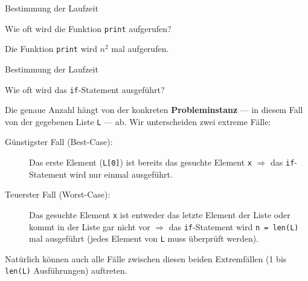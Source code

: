 \begin{frame}{Bestimmung der Laufzeit \faStar\faStar[regular]\faStar[regular]\faStar[regular]\faStar[regular]}
	\begin{myexercise}
	

	Wie oft wird die Funktion \lstinline{print} aufgerufen?
	\end{myexercise}
\end{frame}

\begin{frame}
\begin{myanswer}
	Die Funktion \lstinline{print} wird $n^2$ mal aufgerufen.
\end{myanswer}
\end{frame}

\begin{frame}{Bestimmung der Laufzeit \faStar\faStar\faStar[regular]\faStar[regular]\faStar[regular]}
	\begin{myexercise}
	

	Wie oft wird das \lstinline{if}-Statement ausgeführt? 
	\end{myexercise}
\end{frame}

\begin{frame}
\begin{myanswer}
	Die genaue Anzahl hängt von der konkreten \textbf{Probleminstanz} --- in diesem Fall von der gegebenen Liste \lstinline{L} --- ab. Wir unterscheiden zwei extreme Fälle:
	\begin{description}
		\item[Günstigster Fall (Best-Case):] Das erste Element (\lstinline{L[0]}) ist bereits das gesuchte Element \lstinline{x} $\Rightarrow$ das \lstinline{if}-Statement wird nur einmal ausgeführt.
		\item[Teuerster Fall (Worst-Case):] Das gesuchte Element \lstinline{x} ist entweder das letzte Element der Liste oder kommt in der Liste gar nicht vor $\Rightarrow$ das \lstinline{if}-Statement wird \lstinline{n = len(L)} mal ausgeführt (jedes Element von \lstinline{L} muss überprüft werden).
	\end{description}
	Natürlich können auch alle Fälle zwischen diesen beiden Extremfällen (1 bis \lstinline{len(L)} Ausführungen) auftreten.
\end{myanswer}
\end{frame}

